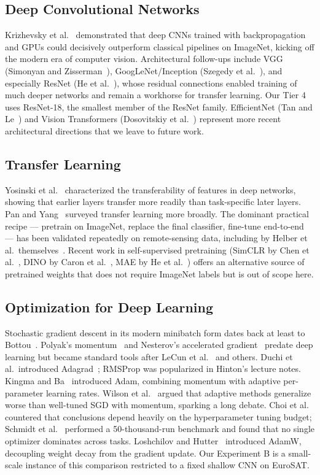 \documentclass[10pt,letterpaper]{article}
\begin{document}
\subsection{Deep Convolutional Networks}
Krizhevsky et al.~\cite{alexnet2012} demonstrated that deep CNNs trained with backpropagation and GPUs could decisively outperform classical pipelines on ImageNet, kicking off the modern era of computer vision. Architectural follow-ups include VGG (Simonyan and Zisserman~\cite{vgg2014}), GoogLeNet/Inception (Szegedy et al.~\cite{googlenet2015}), and especially ResNet (He et al.~\cite{he2016}), whose residual connections enabled training of much deeper networks and remain a workhorse for transfer learning. Our Tier 4 uses ResNet-18, the smallest member of the ResNet family. EfficientNet (Tan and Le~\cite{efficientnet2019}) and Vision Transformers (Dosovitskiy et al.~\cite{vit2020}) represent more recent architectural directions that we leave to future work.

\subsection{Transfer Learning}
Yosinski et al.~\cite{yosinski2014} characterized the transferability of features in deep networks, showing that earlier layers transfer more readily than task-specific later layers. Pan and Yang~\cite{pan2010} surveyed transfer learning more broadly. The dominant practical recipe --- pretrain on ImageNet, replace the final classifier, fine-tune end-to-end --- has been validated repeatedly on remote-sensing data, including by Helber et al.\ themselves~\cite{helber2019}. Recent work in self-supervised pretraining (SimCLR by Chen et al.~\cite{simclr2020}, DINO by Caron et al.~\cite{dino2021}, MAE by He et al.~\cite{mae2021}) offers an alternative source of pretrained weights that does not require ImageNet labels but is out of scope here.

\subsection{Optimization for Deep Learning}
Stochastic gradient descent in its modern minibatch form dates back at least to Bottou~\cite{bottou1998}. Polyak's momentum~\cite{polyak1964} and Nesterov's accelerated gradient~\cite{nesterov1983} predate deep learning but became standard tools after LeCun et al.~\cite{lecun1998} and others. Duchi et al.\ introduced Adagrad~\cite{adagrad2011}; RMSProp was popularized in Hinton's lecture notes. Kingma and Ba~\cite{kingma2014} introduced Adam, combining momentum with adaptive per-parameter learning rates. Wilson et al.~\cite{wilson2017} argued that adaptive methods generalize worse than well-tuned SGD with momentum, sparking a long debate. Choi et al.~\cite{choi2019} countered that conclusions depend heavily on the hyperparameter tuning budget; Schmidt et al.~\cite{schmidt2021} performed a 50-thousand-run benchmark and found that no single optimizer dominates across tasks. Loshchilov and Hutter~\cite{loshchilov2019} introduced AdamW, decoupling weight decay from the gradient update. Our Experiment B is a small-scale instance of this comparison restricted to a fixed shallow CNN on EuroSAT.
\end{document}
